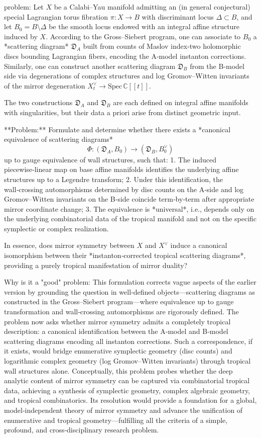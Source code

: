 problem:  
Let \( X \) be a Calabi–Yau manifold admitting an (in general conjectural) special Lagrangian torus fibration \( \pi: X \to B \) with discriminant locus \( \Delta \subset B \), and let \( B_0 = B \setminus \Delta \) be the smooth locus endowed with an integral affine structure induced by \( X \). According to the Gross–Siebert program, one can associate to \( B_0 \) a *scattering diagram* \( \mathfrak{D}_A \) built from counts of Maslov index‑two holomorphic discs bounding Lagrangian fibers, encoding the A‑model instanton corrections. Similarly, one can construct another scattering diagram \( \mathfrak{D}_B \) from the B‑model side via degenerations of complex structures and log Gromov–Witten invariants of the mirror degeneration \( X^\vee_t \to \mathrm{Spec}\,\mathbb{C}[[t]] \).  

The two constructions \( \mathfrak{D}_A \) and \( \mathfrak{D}_B \) are each defined on integral affine manifolds with singularities, but their data a priori arise from distinct geometric input.  

**Problem:**  
Formulate and determine whether there exists a *canonical equivalence of scattering diagrams*  
\[
\Phi: (\mathfrak{D}_A, B_0) \longrightarrow (\mathfrak{D}_B, B_0^\vee)
\]  
up to gauge equivalence of wall structures, such that:  
1. The induced piecewise‑linear map on base affine manifolds identifies the underlying affine structures up to a Legendre transform;  
2. Under this identification, the wall‑crossing automorphisms determined by disc counts on the A‑side and log Gromov–Witten invariants on the B‑side coincide term‑by‑term after appropriate mirror coordinate change;  
3. The equivalence is *universal*, i.e., depends only on the underlying combinatorial data of the tropical manifold and not on the specific symplectic or complex realization.  

In essence, does mirror symmetry between \( X \) and \( X^\vee \) induce a canonical isomorphism between their *instanton‑corrected tropical scattering diagrams*, providing a purely tropical manifestation of mirror duality?  

Why is it a "good" problem:  
This formulation corrects vague aspects of the earlier version by grounding the question in well‑defined objects—scattering diagrams as constructed in the Gross–Siebert program—where equivalence up to gauge transformation and wall‑crossing automorphisms are rigorously defined. The problem now asks whether mirror symmetry admits a completely tropical description: a canonical identification between the A‑model and B‑model scattering diagrams encoding all instanton corrections. Such a correspondence, if it exists, would bridge enumerative symplectic geometry (disc counts) and logarithmic complex geometry (log Gromov–Witten invariants) through tropical wall structures alone.  
Conceptually, this problem probes whether the deep analytic content of mirror symmetry can be captured via combinatorial tropical data, achieving a synthesis of symplectic geometry, complex algebraic geometry, and tropical combinatorics. Its resolution would provide a foundation for a global, model‑independent theory of mirror symmetry and advance the unification of enumerative and tropical geometry—fulfilling all the criteria of a simple, profound, and cross‑disciplinary research problem.